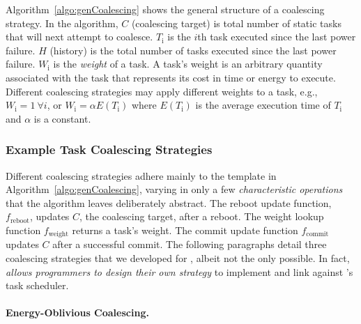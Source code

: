 Algorithm~\ref{algo:genCoalescing} shows the general structure of a coalescing strategy. In the algorithm, $C$ (coalescing target) is total number of static tasks that \sys will next attempt to coalesce. $T_\text{i}$ is the $i$th task executed since the last power failure. $H$ (history) is the total number of tasks executed since the last power failure. $W_\text{i}$ is the {\em weight} of a task. A task's weight is an arbitrary quantity associated with the task that represents its cost in time or energy to execute. Different coalescing strategies may apply different weights to a task, e.g., $W_\text{i} = 1\ \forall i$, or $W_\text{i} = \alpha E(T_\text{i})$ where $E(T_\text{i})$ is the average execution time of $T_\text{i}$ and $\alpha$ is a constant.

\subsubsection{Example Task Coalescing Strategies}
\label{subsec:coalescingStrategies}

Different coalescing strategies adhere mainly to the template in Algorithm~\ref{algo:genCoalescing}, varying in only a few {\em characteristic operations} that the algorithm leaves deliberately abstract. The reboot update function, $f_\text{reboot}$, updates $C$, the coalescing target, after a reboot. The weight lookup function $f_\text{weight}$ returns a task's weight. The commit update function $f_\text{commit}$ updates $C$ after a successful commit. The following paragraphs detail three coalescing strategies that we developed for \sys, albeit not the only possible. In fact, \sys \emph{allows programmers to design their own strategy} to implement and link against \sys's task scheduler. 

\paragraph{Energy-Oblivious Coalescing.}
\label{subsec:energyBlind}
 
